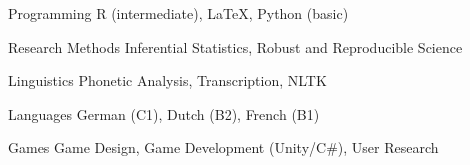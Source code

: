 


\begin{cvskills}


\cvskill
{Programming} %
{R (intermediate), LaTeX, Python (basic)} %


\cvskill
{Research Methods} %
{Inferential Statistics, Robust and Reproducible Science} %


\cvskill
{Linguistics} %
{Phonetic Analysis, Transcription, NLTK} %


\cvskill
{Languages} %
{German (C1), Dutch (B2), French (B1)} %


\cvskill
{Games} %
{Game Design, Game Development (Unity/C\#), User Research} %


\end{cvskills}